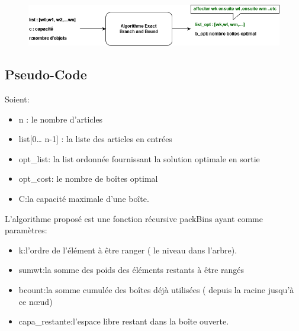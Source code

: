 \documentclass[12pt]{article}
\begin{document}
\begin{figure}[h]
    \includegraphics[width=\linewidth]{../figures/diagr1.png}
\end{figure}
\subsection{Pseudo-Code}
Soient:
\begin{itemize}
    \item n : le nombre d’articles 
    \item list[0… n-1] : la liste des articles en entrées 
    \item opt\_list: la list ordonnée fournissant la solution optimale en sortie 
    \item opt\_cost: le nombre de boîtes optimal
    \item C:la capacité maximale d’une boîte. 
\end{itemize}

L’algorithme proposé est une fonction récursive packBins ayant comme paramètres:
\begin{itemize}
    \item k:l’ordre de l’élément à être ranger ( le niveau dans l’arbre).
    \item sumwt:la somme des poids des éléments restants à être rangés
    \item bcount:la somme cumulée des boîtes déjà utilisées ( depuis la racine jusqu’à ce nœud)
    \item capa\_restante:l’espace libre restant dans la boîte ouverte.
     
\end{itemize}
\end{document}
